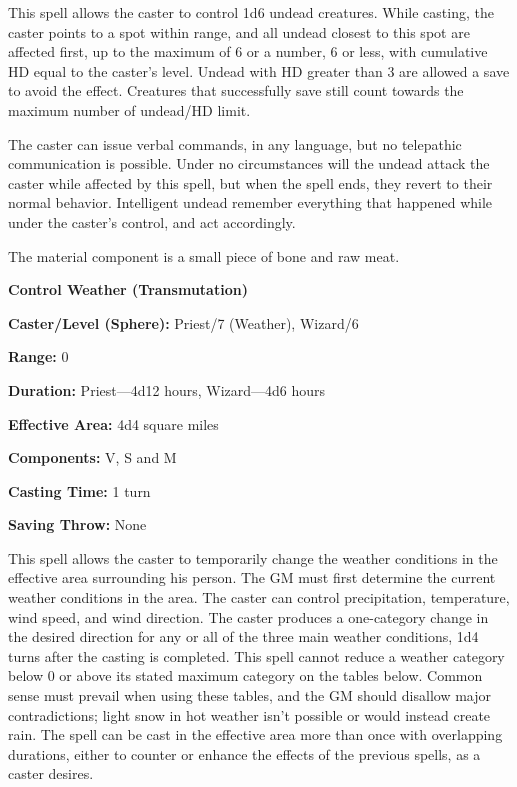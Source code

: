 \begin{multicols}{2}
\begin{minipage}{\columnwidth}
\end{minipage}

This spell allows the caster to control 1d6 undead creatures.  While casting, the caster points to a spot within range, and all undead closest to this spot are affected first, up to the maximum of 6 or a number, 6 or less, with cumulative HD equal to the caster's level.  Undead with HD greater than 3 are allowed a save to avoid the effect.  Creatures that successfully save still count towards the maximum number of undead/HD limit.

The caster can issue verbal commands, in any language, but no telepathic communication is possible.  Under no circumstances will the undead attack the caster while affected by this spell, but when the spell ends, they revert to their normal behavior.  Intelligent undead remember everything that happened while under the caster's control, and act accordingly. 

The material component is a small piece of bone and raw meat.

\vspace{1em}

\noindent
\begin{minipage}{\columnwidth}

\noindent \textbf{Control Weather (Transmutation)}

\noindent \textbf{Caster/Level (Sphere):} Priest/7 (Weather), Wizard/6

\noindent \textbf{Range:} 0

\noindent \textbf{Duration:} Priest---4d12 hours, Wizard---4d6 hours

\noindent \textbf{Effective Area:} 4d4 square miles

\noindent \textbf{Components:} V, S and M

\noindent \textbf{Casting Time:} 1 turn

\noindent \textbf{Saving Throw:} None

\end{minipage}

This spell allows the caster to temporarily change the weather conditions in the effective area surrounding his person.  The GM must first determine the current weather conditions in the area.  The caster can control precipitation, temperature, wind speed, and wind direction.  The caster produces a one-category change in the desired direction for any or all of the three main weather conditions, 1d4 turns after the casting is completed. This spell cannot reduce a weather category below 0 or above its stated maximum category on the tables below.  Common sense must prevail when using these tables, and the GM should disallow major contradictions; light snow in hot weather isn't possible or would instead create rain.  The spell can be cast in the effective area more than once with overlapping durations, either to counter or enhance the effects of the previous spells, as a caster desires.


\end{multicols}
